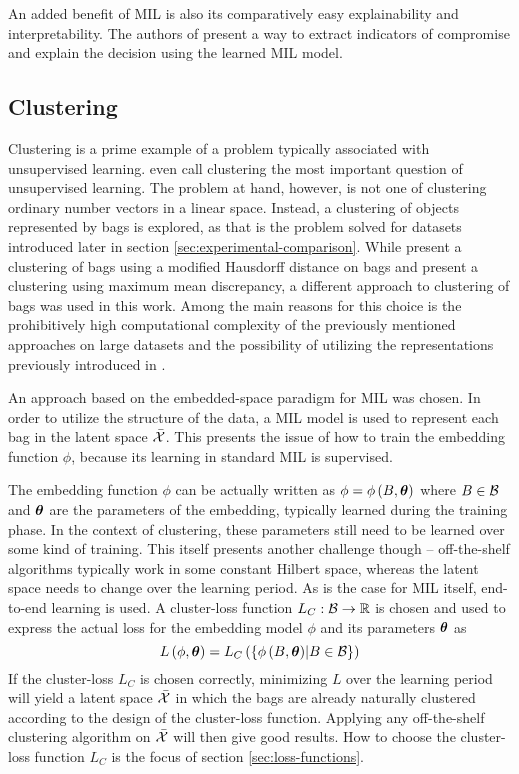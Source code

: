 An added benefit of MIL is also its comparatively easy explainability and interpretability. The authors of \cite{pevny_nested_2020} present a way to extract indicators of compromise and explain the decision using the learned MIL model.

\subsection{Clustering}
Clustering is a prime example of a problem typically associated with unsupervised learning. \cite{xu_comprehensive_2015} even call clustering the most important question of unsupervised learning. The problem at hand, however, is not one of clustering ordinary number vectors in a linear space. Instead, a clustering of objects represented by bags is explored, as that is the problem solved for datasets introduced later in section \ref{sec:experimental-comparison}. While \cite{wang_solving_2000} present a clustering of bags using a modified Hausdorff distance on bags and \cite{kohout_network_2018} present a clustering using maximum mean discrepancy, a different approach to clustering of bags was used in this work. Among the main reasons for this choice is the prohibitively high computational complexity of the previously mentioned approaches on large datasets and the possibility of utilizing the representations previously introduced in \cite{pevny_nested_2020}.

An approach based on the embedded-space paradigm for MIL was chosen. In order to utilize the structure of the data, a MIL model is used to represent each bag in the latent space \( \bar{\mathcal{X}} \). This presents the issue of how to train the embedding function \( \phi \), because its learning in standard MIL is supervised.

The embedding function \( \phi \) can be actually written as \( \phi = \phi \left( B, \bm{\theta} \right) \) where \( B \in \mathcal{B} \) and \( \bm{\theta} \) are the parameters of the embedding, typically learned during the training phase. In the context of clustering, these parameters still need to be learned over some kind of training. This itself presents another challenge though -- off-the-shelf algorithms typically work in some constant Hilbert space, whereas the latent space needs to change over the learning period. As is the case for MIL itself, end-to-end learning is used. A cluster-loss function \( L_C: \mathcal{B} \to \mathbb{R} \) is chosen and used to express the actual loss for the embedding model \( \phi \) and its parameters \( \bm{\theta} \) as
\[ L \left( \phi, \bm{\theta} \right) = L_C \left( \left\{ \phi \left( B, \bm{\theta} \right) \middle| B \in \mathcal{B} \right\} \right) \]
If the cluster-loss \( L_C \) is chosen correctly, minimizing \( L \) over the learning period will yield a latent space \( \bar{\mathcal{X}} \) in which the bags are already naturally clustered according to the design of the cluster-loss function. Applying any off-the-shelf clustering algorithm on \( \bar{\mathcal{X}} \) will then give good results. How to choose the cluster-loss function \( L_C \) is the focus of section \ref{sec:loss-functions}.

